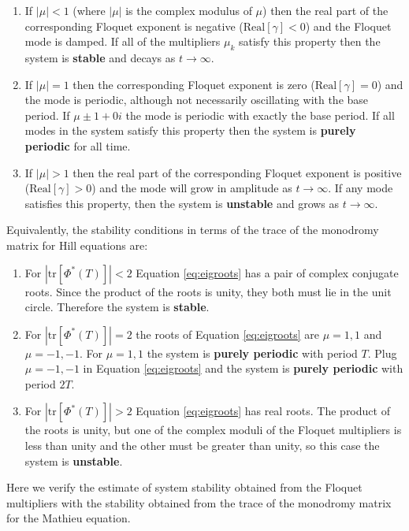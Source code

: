 \documentclass{article}
\begin{document}
\begin{enumerate}[label=(\alph*)]
\item If $|\mu|<1$ (where $|\mu|$ is the complex modulus of $\mu$) then the real part of the corresponding
 Floquet exponent is negative ($\text{Real}[\gamma]<0$) and the Floquet mode is 
 damped. If all of the multipliers $\mu_k$ satisfy this property then the system is 
 \textbf{stable} and decays as $t\rightarrow\infty$. 
\item If $|\mu|=1$ then the corresponding
 Floquet exponent is zero ($\text{Real}[\gamma]=0$) and the mode is 
 periodic, although not necessarily oscillating with the base period. 
 If $\mu\pm1+0i$ the mode is periodic with exactly the base period.
 If all modes in the system satisfy this property then the system 
 is \textbf{purely periodic} for all time.
\item If $|\mu|>1$ then the real part of the corresponding
 Floquet exponent is positive ($\text{Real}[\gamma]>0$) and the mode 
 will grow in amplitude as $t\rightarrow\infty$. If any mode satisfies this 
 property, then the system is \textbf{unstable} and grows as $t\rightarrow\infty$.
\end{enumerate}
Equivalently, the stability conditions in terms of the 
trace of the monodromy matrix for Hill equations are:
\begin{enumerate}[label=(\alph*)]
\item For $|\text{tr}[\Phi^*(T)]|<2$ Equation \ref{eq:eigroots} has a pair of complex conjugate 
roots. Since the product 
of the roots is unity, they both must lie in the unit circle. 
Therefore the system is \textbf{stable}.
\item For $|\text{tr}[\Phi^*(T)]|=2$ the roots of Equation \ref{eq:eigroots} are $\mu=1,1$ and
$\mu=-1,-1$. For $\mu=1,1$ the system is \textbf{purely periodic} 
with period $T$. Plug $\mu=-1,-1$ in Equation \ref{eq:eigroots} and the system is \textbf{purely periodic} 
with period $2T$.
\item For $|\text{tr}[\Phi^*(T)]|>2$ Equation \ref{eq:eigroots} has real roots. The product 
of the roots is unity, but one of the complex moduli of the Floquet multipliers is 
less than unity and the other must be greater
than unity, so this case the system is \textbf{unstable}.
\end{enumerate}
Here we verify the estimate of system stability obtained from the Floquet multipliers 
with the stability obtained from the trace of the monodromy matrix for the Mathieu equation.
\end{document}
